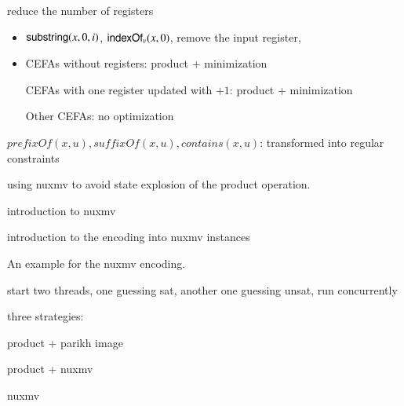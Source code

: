 reduce the number of registers
\begin{itemize}
\item $\mathsf{substring}(x, 0, i)$, $\mathsf{indexOf}_v(x, 0)$, remove the input register,
%
\item CEFAs without registers: product + minimization 

CEFAs with one register updated with $+1$: product + minimization

Other CEFAs: no optimization
\end{itemize}

$prefixOf(x, u), suffixOf(x,u), contains(x, u)$: transformed into regular constraints

using nuxmv to avoid state explosion of the product operation.

introduction to nuxmv

introduction to the encoding into nuxmv instances

\begin{example}
An example for the nuxmv encoding.
\end{example}

start two threads, one guessing sat, another one guessing unsat, run concurrently

three strategies: 

product + parikh image

product + nuxmv

nuxmv


